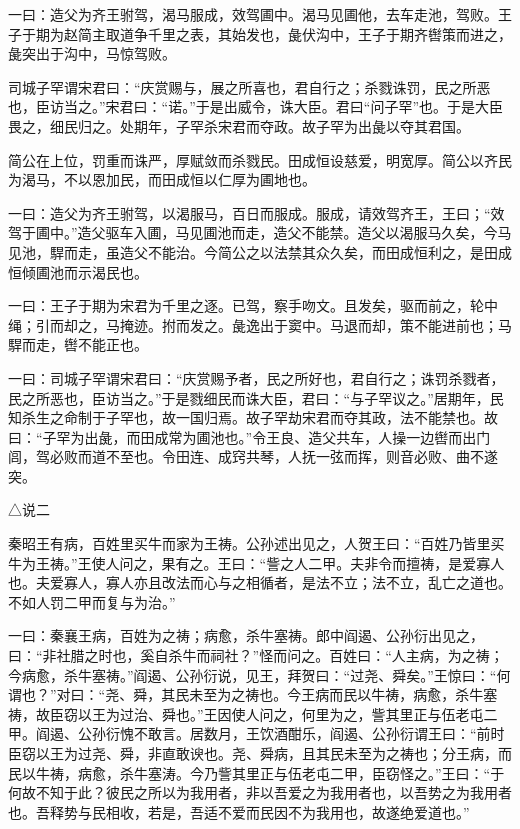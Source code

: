 \documentclass[]{article}
\begin{document}
一曰：造父为齐王驸驾，渴马服成，效驾圃中。渴马见圃他，去车走池，驾败。王子于期为赵简主取道争千里之表，其始发也，彘伏沟中，王子于期齐辔策而进之，彘突出于沟中，马惊驾败。

司城子罕谓宋君曰：``庆赏赐与，展之所喜也，君自行之；杀戮诛罚，民之所恶也，臣访当之。''宋君曰：``诺。''于是出威令，诛大臣。君曰``问子罕''也。于是大臣畏之，细民归之。处期年，子罕杀宋君而夺政。故子罕为出彘以夺其君国。

简公在上位，罚重而诛严，厚赋敛而杀戮民。田成恒设慈爱，明宽厚。简公以齐民为渴马，不以恩加民，而田成恒以仁厚为圃地也。

一曰：造父为齐王驸驾，以渴服马，百日而服成。服成，请效驾齐王，王曰；``效驾于圃中。''造父驱车入圃，马见圃池而走，造父不能禁。造父以渴服马久矣，今马见池，駻而走，虽造父不能治。今简公之以法禁其众久矣，而田成恒利之，是田成恒倾圃池而示渴民也。

一曰：王子于期为宋君为千里之逐。已驾，察手吻文。且发矣，驱而前之，轮中绳；引而却之，马掩迹。拊而发之。彘逸出于窦中。马退而却，策不能进前也；马駻而走，辔不能正也。

一曰：司城子罕谓宋君曰：``庆赏赐予者，民之所好也，君自行之；诛罚杀戮者，民之所恶也，臣访当之。''于是戮细民而诛大臣，君曰：``与子罕议之。''居期年，民知杀生之命制于子罕也，故一国归焉。故子罕劫宋君而夺其政，法不能禁也。故曰：``子罕为出彘，而田成常为圃池也。''令王良、造父共车，人操一边辔而出门闾，驾必败而道不至也。令田连、成窍共琴，人抚一弦而挥，则音必败、曲不遂突。

△说二

秦昭王有病，百姓里买牛而家为王祷。公孙述出见之，人贺王曰：``百姓乃皆里买牛为王祷。''王使人问之，果有之。王曰：``訾之人二甲。夫非令而擅祷，是爱寡人也。夫爱寡人，寡人亦且改法而心与之相循者，是法不立；法不立，乱亡之道也。不如人罚二甲而复与为治。''

一曰：秦襄王病，百姓为之祷；病愈，杀牛塞祷。郎中阎遏、公孙衍出见之，曰：``非社腊之时也，奚自杀牛而祠社？''怪而问之。百姓曰：``人主病，为之祷；今病愈，杀牛塞祷。''阎遏、公孙衍说，见王，拜贺曰：``过尧、舜矣。''王惊曰：``何谓也？''对曰：``尧、舜，其民未至为之祷也。今王病而民以牛祷，病愈，杀牛塞祷，故臣窃以王为过治、舜也。''王因使人问之，何里为之，訾其里正与伍老屯二甲。阎遏、公孙衍愧不敢言。居数月，王饮酒酣乐，阎遏、公孙衍谓王曰：``前时臣窃以王为过尧、舜，非直敢谀也。尧、舜病，且其民未至为之祷也；分王病，而民以牛祷，病愈，杀牛塞涛。今乃訾其里正与伍老屯二甲，臣窃怪之。''王曰：``于何故不知于此？彼民之所以为我用者，非以吾爱之为我用者也，以吾势之为我用者也。吾释势与民相收，若是，吾适不爱而民因不为我用也，故遂绝爱道也。''
\end{document}
